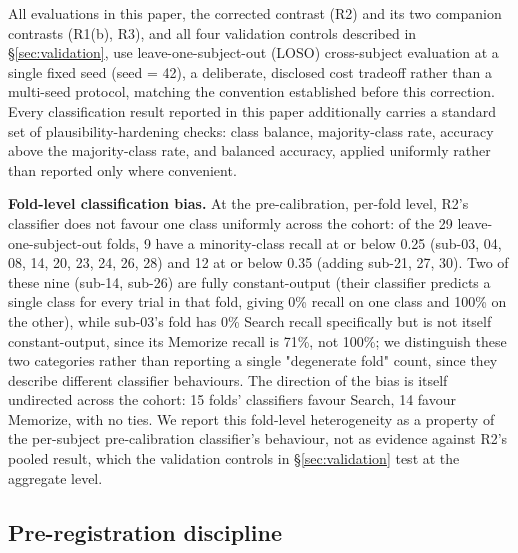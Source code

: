 \documentclass[preprint,12pt]{elsarticle}
\begin{document}
All evaluations in this paper, the corrected contrast (R2) and its two companion contrasts (R1(b), R3), and all four validation controls described in \S\ref{sec:validation}, use leave-one-subject-out (LOSO) cross-subject evaluation \cite{shenoy2006,vidaurre2011,samek2013,jayaram2016} at a single fixed seed (seed = 42), a deliberate, disclosed cost tradeoff rather than a multi-seed protocol, matching the convention established before this correction. Every classification result reported in this paper additionally carries a standard set of plausibility-hardening checks: class balance, majority-class rate, accuracy above the majority-class rate, and balanced accuracy, applied uniformly rather than reported only where convenient.

\textbf{Fold-level classification bias.} At the pre-calibration, per-fold level, R2's classifier does not favour one class uniformly across the cohort: of the 29 leave-one-subject-out folds, 9 have a minority-class recall at or below 0.25 (sub-03, 04, 08, 14, 20, 23, 24, 26, 28) and 12 at or below 0.35 (adding sub-21, 27, 30). Two of these nine (sub-14, sub-26) are fully constant-output (their classifier predicts a single class for every trial in that fold, giving 0\% recall on one class and 100\% on the other), while sub-03's fold has 0\% Search recall specifically but is not itself constant-output, since its Memorize recall is 71\%, not 100\%; we distinguish these two categories rather than reporting a single "degenerate fold" count, since they describe different classifier behaviours. The direction of the bias is itself undirected across the cohort: 15 folds' classifiers favour Search, 14 favour Memorize, with no ties. We report this fold-level heterogeneity as a property of the per-subject pre-calibration classifier's behaviour, not as evidence against R2's pooled result, which the validation controls in \S\ref{sec:validation} test at the aggregate level.

\subsection{Pre-registration discipline}\label{sec:preregistration}
\end{document}

